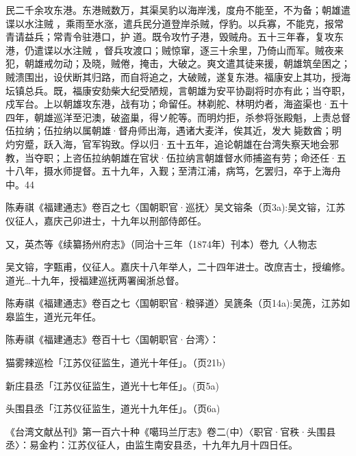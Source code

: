 \noindent 民二千余攻东港。东港贼数万，其渠吴豹以海岸浅，度舟不能至，不为备；朝雄遣谍以水注贼𪿫，乘雨至水涨，遣兵民分道登岸杀贼，俘豹。以兵寡，不能克，报常青请益兵；常青令驻港口，护𫗵道。既令攻竹子港，毁贼舟。五十三年春，复攻东港，仍遣谍以水注贼𪿫，督兵攻渡口；贼惊窜，逐三十余里，乃倚山而军。贼夜来犯，朝雄戒勿动；及晓，贼倦，掩击，大破之。爽文遣其徒来援，朝雄筑垒困之；贼溃围出，设伏断其归路，而自将追之，大破贼，遂复东港。福康安上其功，授海坛镇总兵。既，福康安劾柴大纪受陋规，言朝雄为安平协副将时亦有此；当夺职，戍军台。上以朝雄攻东港，战有功；命留任。林剃舵、林明灼者，海盗渠也·五十四年，朝雄巡洋至汜澳，破盗巢，得ソ舵等。而明灼拒，杀参将张殿魁，上责总督伍拉纳；伍拉纳以属朝雄·督舟师出海，遇诸大麦洋，俟其近，发大𪿫毙数酋；明灼穷蹙，跃入海，官军钩致。俘以归·五十五年，追论朝雄在台湾失察天地会邪教，当夺职；上咨伍拉纳朝雄在官状·伍拉纳言朝雄督水师捕盗有劳；命还任·五十八年，摄水师提督。五十九年，入觐；至清江浦，病笃，乞罢归，卒于上海舟中。44


\noindent 陈寿祺《福建通志》卷百之七〈国朝职官·巡抚〉吴文镕条（页3a):吴文镕，江苏仪征人，嘉庆己卯进士，十九年以刑部侍郎任。

又，英杰等《续纂扬州府志》（同治十三年（1874年）刊本）卷九〈人物志


\noindent 吴文镕，字甄甫，仪征人。嘉庆十八年举人，二十四年进士。改庶吉士，授编修。道光…十九年，授福建巡抚两署闽浙总督。


\noindent 陈寿祺《福建通志》卷百之七〈国朝职官·粮驿道〉吴篪条（页14a):吴箎，江苏如皋监生，道光元年任。

\vfill
\begin{BookNotes}
\end{BookNotes}


\noindent 陈寿祺《福建通志》卷百十七〈国朝职官·台湾〉：

猫雾辣巡检「江苏仪征监生，道光十年任」。（页21b)

新庄县丞「江苏仪征监生，道光十七年任」。(页5a)

头围县丞「江苏仪征监生，道光十九年任」。（页6a)

《台湾文献丛刊》第一百六十种《噶玛兰厅志》卷二(中）〈职官·官秩·头围县丞〉：易金杓：江苏仪征人，由监生南安县丞，十九年九月十四日任。

